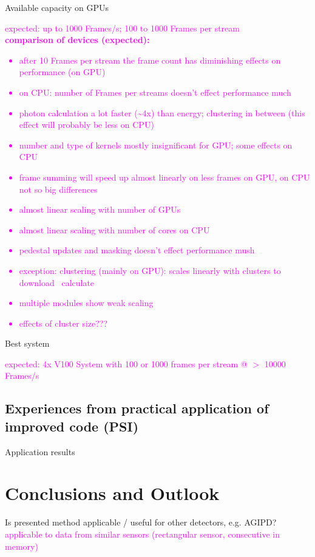 \documentclass[a4paper]{article}
\begin{document}
Available capacity on GPUs\\

\textcolor{magenta}{
expected: up to 1000 Frames/s; 100 to 1000 Frames per stream \\
\textbf{comparison of devices (expected):}
\begin{itemize}
	\item after 10 Frames per stream the frame count has diminishing effects on performance (on GPU)
	\item on CPU: number of Frames per streams doesn't effect performance much
	\item photon calculation a lot faster (\textasciitilde4x) than energy; clustering in between (this effect will probably be less on CPU)
	\item number and type of kernels mostly insignificant for GPU; some effects on CPU
	\item frame summing will speed up almost linearly on less frames on GPU, on CPU not so big differences
	\item almost linear scaling with number of GPUs
	\item almost linear scaling with number of cores on CPU
	\item pedestal updates and masking doesn't effect performance mush
	\item exception: clustering (mainly on GPU): scales linearly with clusters to download \ calculate
	\item multiple modules show weak scaling
	\item effects of cluster size???
\end{itemize}
}

Best system

\textcolor{magenta}{
	expected: 4x V100 System with 100 or 1000 frames per stream @ $>$ 10000 Frames/s
}

\subsection{Experiences from practical application of improved code (PSI)}
Application results

\section{Conclusions and Outlook}
\label{sec:conclusions}
Is presented method applicable / useful for other detectors, e.g. AGIPD? \\

\textcolor{magenta}{
applicable to data from similar sensors (rectangular sensor, consecutive in memory)
}
\end{document}
